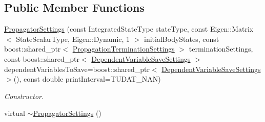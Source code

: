 \subsection*{Public Member Functions}
\begin{DoxyCompactItemize}
\item 
\hyperlink{classtudat_1_1propagators_1_1PropagatorSettings_ad4b64ceaf84f1f636ea8effd5f0ff50d}{Propagator\+Settings} (const Integrated\+State\+Type state\+Type, const Eigen\+::\+Matrix$<$ State\+Scalar\+Type, Eigen\+::\+Dynamic, 1 $>$ initial\+Body\+States, const boost\+::shared\+\_\+ptr$<$ \hyperlink{classtudat_1_1propagators_1_1PropagationTerminationSettings}{Propagation\+Termination\+Settings} $>$ termination\+Settings, const boost\+::shared\+\_\+ptr$<$ \hyperlink{classtudat_1_1propagators_1_1DependentVariableSaveSettings}{Dependent\+Variable\+Save\+Settings} $>$ dependent\+Variables\+To\+Save=boost\+::shared\+\_\+ptr$<$ \hyperlink{classtudat_1_1propagators_1_1DependentVariableSaveSettings}{Dependent\+Variable\+Save\+Settings} $>$(), const double print\+Interval=T\+U\+D\+A\+T\+\_\+\+N\+AN)
\begin{DoxyCompactList}\small\item\em Constructor. \end{DoxyCompactList}\item 
virtual \hyperlink{classtudat_1_1propagators_1_1PropagatorSettings_a65e44fea8537b9cc68d1e3d9b1fee714}{$\sim$\+Propagator\+Settings} ()\hypertarget{classtudat_1_1propagators_1_1PropagatorSettings_a65e44fea8537b9cc68d1e3d9b1fee714}{}\label{classtudat_1_1propagators_1_1PropagatorSettings_a65e44fea8537b9cc68d1e3d9b1fee714}


\end{DoxyCompactItemize}
